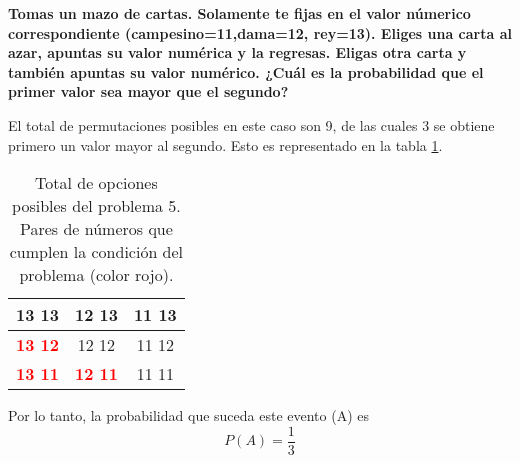 \item \textbf{Tomas un mazo de cartas. Solamente te fijas en el valor númerico correspondiente (campesino=11,dama=12, rey=13). Eliges una carta al azar, apuntas su valor numérica y la regresas. Eligas otra carta y también apuntas su valor numérico. ¿Cuál es la probabilidad que el primer valor sea mayor que el segundo?}

El total de permutaciones posibles en este caso son 9, de las cuales 3 se obtiene primero un valor mayor al segundo. Esto es representado en la tabla \ref{table:problema5}.
\begin{table}
    \centering
    \begin{tabular}{|c|c|c|} \hline
        13 13                           & 12 13                           & 11 13 \\ \hline
        \textbf{\textcolor{red}{13 12}} & 12 12                           & 11 12 \\ \hline
        \textbf{\textcolor{red}{13 11}} & \textbf{\textcolor{red}{12 11}} & 11 11 \\ \hline
    \end{tabular}
    \caption{Total de opciones posibles del problema 5. Pares de números que cumplen la condición del problema (color rojo).}
    \label{table:problema5}
\end{table}
Por lo tanto, la probabilidad que suceda este evento (A) es
\begin{equation*}
    P(A)= \frac{1}{3}
\end{equation*}